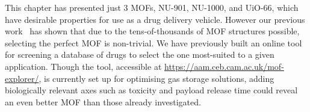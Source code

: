 This chapter has presented just 3 MOFs, NU-901, NU-1000, and UiO-66, which have desirable properties for use as a drug delivery vehicle. 
However our previous work~\cite{moghadam2018computer} has shown that due to the tens-of-thousands of MOF structures possible, selecting the perfect MOF is non-trivial. 
We have previously built an online tool for screening a database of drugs to select the one most-suited to a given application. 
Though the tool, accessible at \url{https://aam.ceb.cam.ac.uk/mof-explorer/}, is currently set up for optimising gas storage solutions, adding biologically relevant axes such as toxicity and payload release time could reveal an even better MOF than those already investigated. 